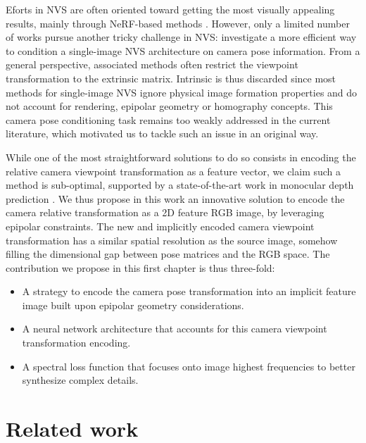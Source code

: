 Eforts in \ac{NVS} are often oriented toward getting the most visually appealing results, mainly through \ac{NeRF}-based methods \citep{mildenhall2020nerf,wang2021neus,barron2021mip,barron2022mip}. However, only a limited number of works pursue another tricky challenge in \ac{NVS}: investigate a more efficient way to condition a single-image \ac{NVS} architecture on camera pose information. From a general perspective, associated methods often restrict the viewpoint transformation to the extrinsic matrix. Intrinsic is thus discarded since most methods for single-image \ac{NVS} ignore physical image formation properties and do not account for rendering, epipolar geometry or homography concepts. This camera pose conditioning task remains too weakly addressed in the current literature, which motivated us to tackle such an issue in an original way.

While one of the most straightforward solutions to do so consists in encoding the relative camera viewpoint transformation as a feature vector, we claim such a method is sub-optimal, supported by a state-of-the-art work in monocular depth prediction \citep{zhao2021camera}. We thus propose in this work an innovative solution to encode the camera relative transformation as a 2D feature RGB image, by leveraging epipolar constraints. The new and implicitly encoded camera viewpoint transformation has a similar spatial resolution as the source image, somehow filling the dimensional gap between pose matrices and the RGB space. The contribution we propose in this first chapter is thus three-fold: 
\begin{itemize}
	\item A strategy to encode the camera pose transformation into an implicit feature image built upon epipolar geometry considerations. 
	\item A neural network architecture that accounts for this camera viewpoint transformation encoding. 
	\item A spectral loss function that focuses onto image highest frequencies to better synthesize complex details.
\end{itemize}

\section{Related work}

